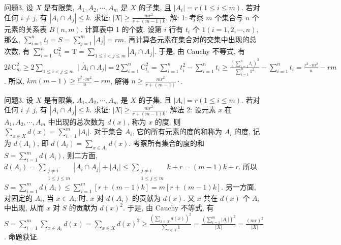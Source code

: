 问题3. 设 $X$ 是有限集, $A_1, A_2, \cdots, A_m$ 是 $X$ 的子集, 且 $\left|A_i\right|=r(1 \leqslant i \leqslant m)$. 若对任何 $i \neq j$, 有 $\left|A_i \cap A_j\right| \leqslant k$. 求证: $|X| \geqslant \frac{m r^2}{r+(m-1) k}$.
解: 1: 考察 $m$ 个集合与 $n$ 个元素的关系表 $B(n, m)$. 计算表中 1 的个数.
设第 $i$ 行有 $t_i$ 个 $1(i=1,2, \cdots, n)$, 那么, $\sum_{i=1}^n t_i=S=\sum_{j=1}^m\left|A_j\right|=r m$. 再计算各元素在集合对的交集中出现的总次数, 有 $\sum_{i=1}^n \mathrm{C}_{t_i}^2=\mathrm{T}= \sum_{1 \leqslant i<j \leqslant m}\left|A_i \cap A_j\right|$. 于是, 由 Cauchy 不等式, 有 $2 k \mathrm{C}_m^2 \geqslant 2 \sum_{1 \leqslant i<j \leqslant m} \mid \dot{A_i} \cap A_j \mid=2 \sum_{i=1}^n \mathrm{C}_{t_i}^2=\sum_{i=1}^n t_i^2-\sum_{i=1}^n t_i \geqslant \frac{\left(\sum_{i=1}^n t_i\right)^2}{\sum_{i=1}^n 1^2}-\sum_{i=1}^n t_i=\frac{r^2 \cdot m^2}{n}-r m$. 所以, $k m(m-1) \geqslant \frac{\dot{r}^2 \cdot m^2}{n}-r m$, 解得 $n \geqslant \frac{m r^2}{r+(m-1)} \cdot$.



问题3. 设 $X$ 是有限集, $A_1, A_2, \cdots, A_m$ 是 $X$ 的子集, 且 $\left|A_i\right|=r(1 \leqslant i \leqslant m)$. 若对任何 $i \neq j$, 有 $\left|A_i \cap A_j\right| \leqslant k$. 求证: $|X| \geqslant \frac{m r^2}{r+(m-1) k}$.
解法 2: 设元素 $x$ 在 $A_1, A_2, \cdots, A_m$ 中出现的总次数为 $d(x)$, 称为 $x$ 的度.
则 $\sum_{x \in X} d(x)=\sum_{i=1}^m\left|A_i\right|$. 对于集合 $A_i$, 它的所有元素的度的和称为 $A_i$ 的度, 记为 $d\left(A_i\right)$, 即 $d\left(A_i\right)=\sum_{x \in A_i} d(x)$. 考察所有集合的度的和 $S=\sum_{i=1}^m d\left(A_i\right)$, 则二方面, $d\left(A_i\right)=\sum_{\substack{j \neq i \\ 1 \leqslant j \leqslant m}}\left|A_i \cap A_j\right|+\left|A_i\right| \leqslant \sum_{\substack{j \neq i \\ 1 \leqslant j \leqslant m}} k+r=(m-1) k+r$. 所以 $S=\sum_{i=1}^m d\left(A_i\right) \leqslant \sum_{i=1}^m[r+(m-1) k]=m[r+(m-1) k]$. 另一方面, 对固定的 $A_i$, 当 $x \in A_i$ 时, $x$ 对 $d\left(A_i\right)$ 的贡献为 $d(x)$. 又 $x$ 共在 $d(x)$ 个 $A_i$ 中出现,
从而 $x$ 对 $S$ 的贡献为 $d(x)^2$. 于是, 由 Cauchy 不等式, 有 $S=\sum_{i=1}^m \sum_{x \in A_i} d(x)= \sum_{x \in X} d(x)^2 \geqslant \frac{\left(\sum_{x \in X} d(x)\right)^2}{\sum_{x \in X} 1}=\frac{\left(\sum_{i=1}^m\left|A_i\right|\right)^2}{|X|}=\frac{(m r)^2}{|X|}$. 命题获证.



